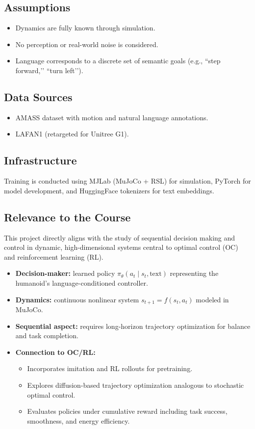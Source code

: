 \documentclass{article}
\begin{document}
\subsection{Assumptions}
\begin{itemize}
    \item Dynamics are fully known through simulation.
    \item No perception or real-world noise is considered.
    \item Language corresponds to a discrete set of semantic goals (e.g., ``step forward,’’ ``turn left’’).
\end{itemize}

\subsection{Data Sources}
\begin{itemize}
    \item AMASS \cite{AMASS:ICCV:2019} dataset with motion and natural language annotations.
    \item LAFAN1 \cite{harvey2020robust} (retargeted for Unitree G1).
\end{itemize}

\subsection{Infrastructure}
Training is conducted using MJLab (MuJoCo + RSL) for simulation, PyTorch for model development, and HuggingFace tokenizers for text embeddings.

\subsection{Relevance to the Course}

This project directly aligns with the study of sequential decision making and control in dynamic, high-dimensional systems central to optimal control (OC) and reinforcement learning (RL).

\begin{itemize}
    \item \textbf{Decision-maker:} learned policy $\pi_\theta(a_t \mid s_t, \text{text})$ representing the humanoid’s language-conditioned controller.
    \item \textbf{Dynamics:} continuous nonlinear system $s_{t+1} = f(s_t, a_t)$ modeled in MuJoCo.
    \item \textbf{Sequential aspect:} requires long-horizon trajectory optimization for balance and task completion.
    \item \textbf{Connection to OC/RL:}
    \begin{itemize}
        \item Incorporates imitation and RL rollouts for pretraining.
        \item Explores diffusion-based trajectory optimization analogous to stochastic optimal control.
        \item Evaluates policies under cumulative reward including task success, smoothness, and energy efficiency.
    \end{itemize}
\end{itemize}
\end{document}
